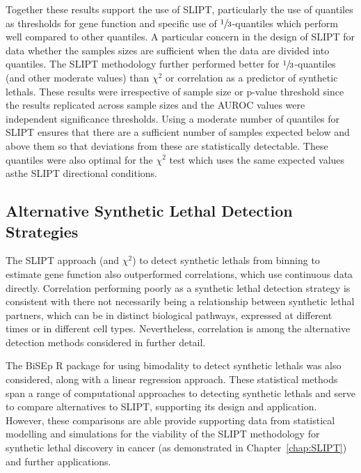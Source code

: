 Together these results support the use of \gls{SLIPT}, particularly the use of quantiles as thresholds for gene function and specific use of $\sfrac{1}{3}$-quantiles which perform well compared to other quantiles. A particular concern in the design of \gls{SLIPT} for  data whether the  samples sizes are sufficient when the data are divided into quantiles. The \gls{SLIPT} methodology further performed better for $\sfrac{1}{3}$-quantiles (and other moderate values) than $\chi^2$ or correlation as a predictor of \glspl{synthetic lethal}. These results were irrespective of sample size or p-value threshold since the results replicated across sample sizes and the \gls{AUROC} values were independent significance thresholds. Using a moderate number of quantiles for \gls{SLIPT} ensures that there are a sufficient number of samples expected below and above them so that deviations from these are statistically detectable. These quantiles were also optimal for the $\chi^2$ test which uses the same expected values asthe \gls{SLIPT} directional conditions.

\FloatBarrier

\subsection{Alternative Synthetic Lethal Detection Strategies}

The \gls{SLIPT} approach (and $\chi^2$) to detect \glspl{synthetic lethal} from binning  to estimate gene function also outperformed correlations, which use continuous data directly. Correlation performing poorly as a \gls{synthetic lethal} detection strategy is consistent with there not necessarily being a relationship between \gls{synthetic lethal} partners, which can be in distinct biological pathways, expressed at different times or in different cell types. Nevertheless, correlation is among the alternative detection methods considered in further detail.

The \gls{BiSEp} R package \citep{Wappett2014} for using bimodality to detect \glspl{synthetic lethal} \citep{Wappett2016} was also considered, along with a linear regression approach. These statistical methods span a range of computational approaches to detecting \glspl{synthetic lethal} and serve to compare alternatives to \gls{SLIPT}, supporting its design and application.
However, these comparisons are able provide supporting data from statistical modelling and simulations for the viability of the \gls{SLIPT} methodology for \gls{synthetic lethal} discovery in cancer (as demonstrated in Chapter~\ref{chap:SLIPT}) and further applications.

